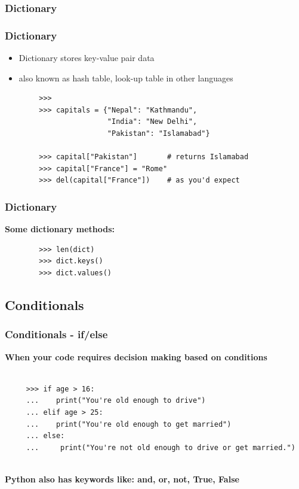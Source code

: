 \documentclass[12pt, aspectratio=169]{beamer}
\begin{document}
\subsubsection{Dictionary}
\begin{frame} [fragile]
  \frametitle{Dictionary}
  \begin{itemize}
  \item Dictionary stores key-value pair data \pause
  \item  also known as hash table, look-up table in other languages \pause
  \end{itemize}
  \vspace{1em}
\begin{verbatim}
        >>> 
        >>> capitals = {"Nepal": "Kathmandu",
                        "India": "New Delhi",
                        "Pakistan": "Islamabad"}

        >>> capital["Pakistan"]       # returns Islamabad
        >>> capital["France"] = "Rome"
        >>> del(capital["France"])    # as you'd expect
\end{verbatim}
\end{frame}

\begin{frame} [fragile]
  \frametitle{Dictionary}
\textbf{Some dictionary methods: }
 \begin{verbatim}
        >>> len(dict)
        >>> dict.keys()
        >>> dict.values()
 \end{verbatim}
\vfill
\end{frame}

\subsection{Conditionals}
\begin{frame} [fragile]
  \frametitle{Conditionals - if/else}
\textbf{When your code requires decision making based on conditions}
\vspace{1em}
 \begin{verbatim}

     >>> if age > 16:
     ...    print("You're old enough to drive")
     ... elif age > 25:
     ...    print("You're old enough to get married")
     ... else:
     ...     print("You're not old enough to drive or get married.")
 
\end{verbatim}
\vspace{1em}
\textbf{Python also has keywords like: and, or, not, True, False}
\vspace{1em}
\end{frame}
\end{document}
